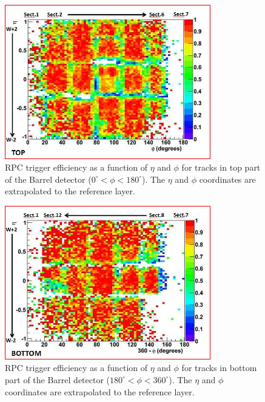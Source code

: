 \begin{figure}[hbtp]
  \begin{center}
     \includegraphics[width=0.8\textwidth]{eff_eta_phi_top_08_new}
      \hspace{1cm}
      \caption{RPC trigger efficiency as a function of $\eta$ and $\phi$ 
      for tracks in top part of the Barrel detector 
      ($ 0^\circ < \phi < 180^\circ $). The $\eta$ and $\phi$
      coordinates are extrapolated to the reference layer.}
    \label{fig:eff_eta_phi_top_08}
  \end{center}
\end{figure}

\begin{figure}[hbtp]
     \begin{center}
      \includegraphics[width=0.8\textwidth]{eff_eta_phi_bot_08_new}
      \hspace{1cm}
      \caption{RPC trigger efficiency as a function of $\eta$ and $\phi$ 
      for tracks in bottom part of the Barrel detector 
      ($ 180^\circ < \phi < 360^\circ $). The $\eta$ and $\phi$
      coordinates are extrapolated to the reference layer.}
    \label{fig:eff_eta_phi_bot_08}
  \end{center}
\end{figure}

